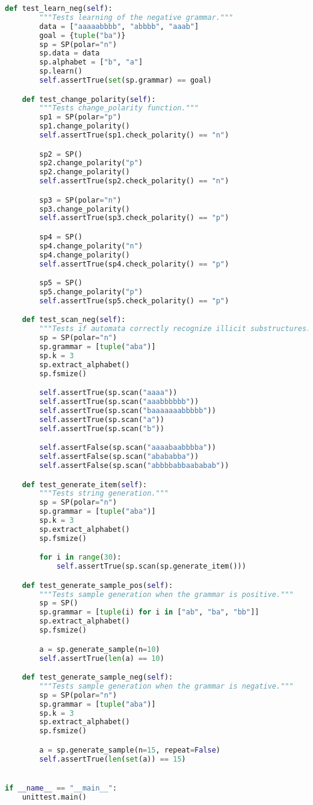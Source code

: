 \begin{lstlisting}[language=Python]
    def test_learn_neg(self):
        """Tests learning of the negative grammar."""
        data = ["aaaaabbbb", "abbbb", "aaab"]
        goal = {tuple("ba")}
        sp = SP(polar="n")
        sp.data = data
        sp.alphabet = ["b", "a"]
        sp.learn()
        self.assertTrue(set(sp.grammar) == goal)

    def test_change_polarity(self):
        """Tests change_polarity function."""
        sp1 = SP(polar="p")
        sp1.change_polarity()
        self.assertTrue(sp1.check_polarity() == "n")

        sp2 = SP()
        sp2.change_polarity("p")
        sp2.change_polarity()
        self.assertTrue(sp2.check_polarity() == "n")

        sp3 = SP(polar="n")
        sp3.change_polarity()
        self.assertTrue(sp3.check_polarity() == "p")

        sp4 = SP()
        sp4.change_polarity("n")
        sp4.change_polarity()
        self.assertTrue(sp4.check_polarity() == "p")

        sp5 = SP()
        sp5.change_polarity("p")
        self.assertTrue(sp5.check_polarity() == "p")

    def test_scan_neg(self):
        """Tests if automata correctly recognize illicit substructures."""
        sp = SP(polar="n")
        sp.grammar = [tuple("aba")]
        sp.k = 3
        sp.extract_alphabet()
        sp.fsmize()

        self.assertTrue(sp.scan("aaaa"))
        self.assertTrue(sp.scan("aaabbbbbb"))
        self.assertTrue(sp.scan("baaaaaaabbbbb"))
        self.assertTrue(sp.scan("a"))
        self.assertTrue(sp.scan("b"))

        self.assertFalse(sp.scan("aaaabaabbbba"))
        self.assertFalse(sp.scan("abababba"))
        self.assertFalse(sp.scan("abbbbabbaababab"))

    def test_generate_item(self):
        """Tests string generation."""
        sp = SP(polar="n")
        sp.grammar = [tuple("aba")]
        sp.k = 3
        sp.extract_alphabet()
        sp.fsmize()

        for i in range(30):
            self.assertTrue(sp.scan(sp.generate_item()))

    def test_generate_sample_pos(self):
        """Tests sample generation when the grammar is positive."""
        sp = SP()
        sp.grammar = [tuple(i) for i in ["ab", "ba", "bb"]]
        sp.extract_alphabet()
        sp.fsmize()

        a = sp.generate_sample(n=10)
        self.assertTrue(len(a) == 10)

    def test_generate_sample_neg(self):
        """Tests sample generation when the grammar is negative."""
        sp = SP(polar="n")
        sp.grammar = [tuple("aba")]
        sp.k = 3
        sp.extract_alphabet()
        sp.fsmize()

        a = sp.generate_sample(n=15, repeat=False)
        self.assertTrue(len(set(a)) == 15)


if __name__ == "__main__":
    unittest.main()

\end{lstlisting}

